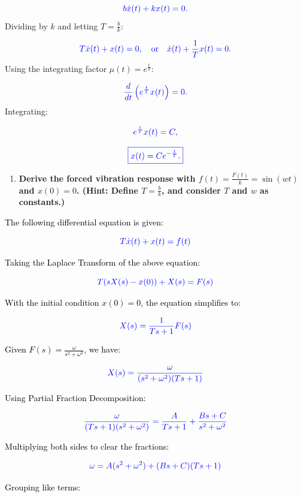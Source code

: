 \documentclass{article}
\begin{document}
\[
	\textcolor{blue}{b \dot{x}(t) + k x(t) = 0.}
\]
Dividing by \( k \) and letting \( T = \frac{b}{k} \):
	      
\[
	\textcolor{blue}{T \dot{x}(t) + x(t) = 0, \quad \text{or} \quad \dot{x}(t) + \frac{1}{T} x(t) = 0.}
\]
Using the integrating factor \( \mu(t) = e^{\frac{t}{T}} \):
	      
\[
	\textcolor{blue}{\frac{d}{dt} \left( e^{\frac{t}{T}} x(t) \right) = 0.}
\]
Integrating:
	      
\[
	\textcolor{blue}{e^{\frac{t}{T}} x(t) = C,}
\]
	      
\[
	\textcolor{blue}{\boxed{x(t) = C e^{-\frac{t}{T}}.}}
\]
	      
	          
\newpage
\begin{enumerate}
	\item[(c)] \textbf{Derive the forced vibration response with $f(t) = \frac{F(t)}{k} = \sin(wt)$ and $x(0) = 0$. (Hint: Define $T = \frac{b}{k}$, and consider $T$ and $w$ as constants.)}
\end{enumerate}
	      
	      
\noindent
\textcolor{black}{The following differential equation is given:}

\[
	\textcolor{blue}{T \dot{x}(t) + x(t) = f(t)}
\]

\noindent
\textcolor{black}{Taking the Laplace Transform of the above equation:}

\[
	\textcolor{blue}{T(sX(s) - x(0)) + X(s) = F(s)}
\]

\noindent
\textcolor{black}{With the initial condition \( x(0) = 0 \), the equation simplifies to:}

\[
	\textcolor{blue}{X(s) = \frac{1}{Ts + 1} F(s)}
\]

\noindent
\textcolor{black}{Given \( F(s) = \frac{\omega}{s^2 + \omega^2} \), we have:}

\[
	\textcolor{blue}{X(s) = \frac{\omega}{(s^2 + \omega^2)(Ts + 1)}}
\]

\noindent
\textcolor{black}{Using Partial Fraction Decomposition:}

\[
	\textcolor{blue}{\frac{\omega}{(Ts + 1)(s^2 + \omega^2)} = \frac{A}{Ts + 1} + \frac{Bs + C}{s^2 + \omega^2}}
\]

\noindent
\textcolor{black}{Multiplying both sides to clear the fractions:}

\[
	\textcolor{blue}{\omega = A(s^2 + \omega^2) + (Bs + C)(Ts + 1)}
\]

\noindent
\textcolor{black}{Grouping like terms:}
\end{document}
